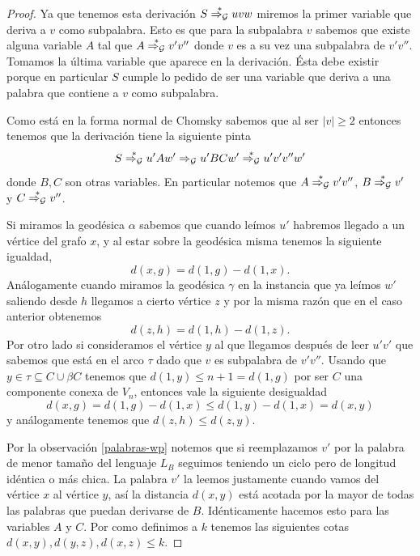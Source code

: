 \documentclass[tesis.tex]{subfiles}
\begin{document}
\begin{proof}
	Ya que tenemos esta derivación $S \overset{*}{\Rightarrow_{\cal G}} uvw$ miremos la primer variable que deriva a $v$ como subpalabra. 
	Esto es que para la subpalabra $v$ sabemos que existe alguna variable $A$ tal que $A \overset{*}{\Rightarrow_{\cal G}} v'v''$ donde $v$ es a su vez una subpalabra de $v'v''$. 
	Tomamos la última variable que aparece en la derivación.
	Ésta debe existir porque en particular $S$ cumple lo pedido de ser una variable que deriva a una palabra que contiene a $v$ como subpalabra.
	
	Como está en la forma normal de Chomsky sabemos que al ser $|v| \ge 2$ entonces tenemos que la derivación tiene la siguiente pinta
	\begin{equation*}
		S \overset{*}{\Rightarrow_{\cal G}} u'Aw' \Rightarrow_{\cal G} u'BC w' \overset{*}{\Rightarrow_{\cal G}} u'v'v''w'
	\end{equation*}
	donde $B,C$ son otras variables. En particular notemos que $A \overset{*}{\Rightarrow_{\cal G}} v'v''$, $B \overset{*}{\Rightarrow_{\cal G}} v'$ y $C \overset{*}{\Rightarrow_{\cal G}} v''$.
	
	
	Si miramos la geodésica $\alpha$ sabemos que cuando leímos $u'$ habremos llegado a un vértice del grafo $x$, y al estar sobre la geodésica misma tenemos la siguiente igualdad,
	\begin{equation*}
		d(x,g) = d(1,g) - d(1,x).
	\end{equation*}
	Análogamente cuando miramos la geodésica $\gamma$ en la instancia que ya leímos $w'$ saliendo desde $h$ llegamos a cierto vértice $z$ y por la misma razón que en el caso anterior obtenemos
	\begin{equation*}
		d(z,h) = d(1,h) - d(1,z).
	\end{equation*}
	Por otro lado si consideramos el vértice $y$ al que llegamos después de leer $u'v'$ que sabemos que está en el arco $\tau$ dado que $v$ es subpalabra de $v'v''$.
	Usando que $y \in \tau \subseteq C \cup \beta C$ tenemos que $d(1,y) \le n+1 = d(1,g)$ por ser $C$ una componente conexa de $V_n$, entonces vale la siguiente desigualdad
	\begin{equation*}
		d(x,g) = d(1,g) - d(1,x) \le d(1,y) - d(1,x) = d(x,y)
	\end{equation*}
	y análogamente tenemos que $d(z,h) \le d(z,y)$.
	
	
	Por la observación \ref{palabras-wp} notemos que si reemplazamos $v'$ por la palabra de menor tamaño del lenguaje $L_B$ seguimos teniendo un ciclo pero de longitud idéntica o más chica. 
	La palabra $v'$ la leemos justamente cuando vamos del vértice $x$ al vértice $y$, así la distancia  $d(x,y)$ está acotada por la mayor de todas las palabras que puedan derivarse de $B$. 
	Idénticamente hacemos esto para las variables $A$ y $C$.
	Por como definimos a $k$ tenemos las siguientes cotas $d(x,y), d(y,z), d(x,z) \le k$.
	

\end{proof}
\end{document}
